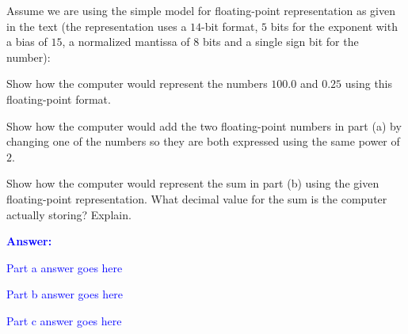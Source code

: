\item{}
Assume we are using the simple model for floating-point representation as
given in the text (the representation uses a $14$-bit format, $5$ bits for the
exponent with a bias of $15$, a normalized mantissa of $8$ bits and a single
sign bit for the number):
\begin{list}{\textbf{}}{}
    \item Show how the computer would represent the numbers $100.0$ and $0.25$
    using this floating-point format.
    \item Show how the computer would add the two floating-point numbers in
    part (a) by changing one of the numbers so they are both expressed using
    the same power of $2$.
    \item Show how the computer would represent the sum in part (b) using the
    given floating-point representation. What decimal value for the sum is the
    computer actually storing? Explain.
\end{list}
\vskip12pt
\ifanswers
\textcolor{blue}{
\textbf{Answer:}\\
\begin{list}{\textbf{}}{}
    \item Part a answer goes here
    \item Part b answer goes here
    \item Part c answer goes here
\end{list}
}
\newpage
\fi
